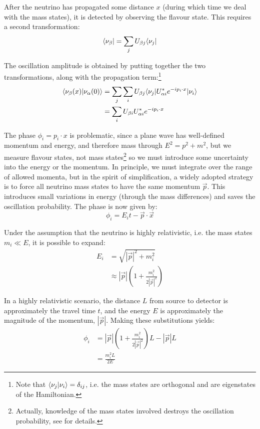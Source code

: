 After the neutrino has propagated some distance $x$ (during which time we deal with the mass states), it is detected by observing the flavour state. This requires a second transformation:
\begin{equation}\label{eqn:nu_mass_to_flavour_transf}
\langle \nu_{\beta}| = \sum_j U_{\beta j} \langle \nu_{j}|
\end{equation}

The oscillation amplitude is obtained by putting together the two transformations, along with the propagation term:\footnote{Note that $\langle \nu_j|\nu_i\rangle = \delta_{ij}$, i.e. the mass states are orthogonal and are eigenstates of the Hamiltonian.}
\begin{align}\label{eqn:oscillation_amplitude}
\langle \nu_\beta(x)|\nu_\alpha(0)\rangle & = \sum_j \sum_i U_{\beta j} \langle \nu_{j}| U_{\alpha i}^* e^{-i p_i\cdot x}|\nu_{i}\rangle \\
 & = \sum_i U_{\beta i} U_{\alpha i}^* e^{-i p_i\cdot x} \nonumber
\end{align}

The phase $\phi_i = p_i\cdot x$ is problematic, since a plane wave has well-defined momentum and energy, and therefore mass through $E^2 = p^2 + m^2$, but we measure flavour states, not mass states\footnote{Actually, knowledge of the mass states involved destroys the oscillation probability, see \citep{Kayser1981} for details.} so we must introduce some uncertainty into the energy or the momentum. In principle, we must integrate over the range of allowed momenta, but in the spirit of simplification, a widely adopted strategy is to force all neutrino mass states to have the same momentum $\vec{p}$. This introduces small variations in energy (through the mass differences) and saves the oscillation probability. The phase is now given by:
\begin{equation}\label{eqn:phase}
\phi_i = E_i t - \vec{p}\cdot\vec{x}
\end{equation}

Under the assumption that the neutrino is highly relativistic, i.e. the mass states $m_i \ll E$, it is possible to expand:
\begin{align}\label{eqn:energy_expansion}
E_i & = \sqrt{|\vec{p}|^2 + m_i^2} \nonumber \\
 & \approx |\vec{p}|\left(1 + \frac{m_i^2}{2|\vec{p}|^2}\right) 
\end{align}

In a highly relativistic scenario, the distance $L$ from source to detector is approximately the travel time $t$, and the energy $E$ is approximately the magnitude of the momentum, $|\vec{p}|$. Making these substitutions yields:
\begin{align}\label{eqn:phase_expanded}
\phi_i &=\displaystyle |\vec{p}|\left(1 + \frac{m_i^2}{2|\vec{p}|^2}\right)L - |\vec{p}|L \\
 &= \displaystyle \frac{m_i^2 L}{2E} \nonumber
\end{align}

